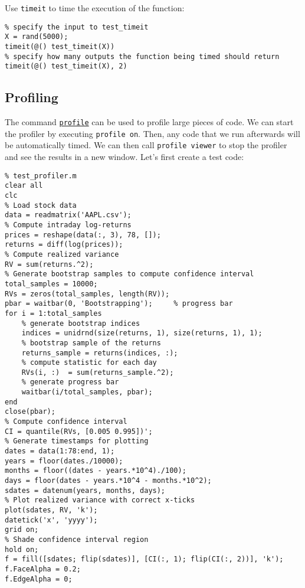 \documentclass[12pt, a4paper]{article}
\begin{document}
Use \texttt{timeit} to time the execution of the function:
\lstset{language=matlab,label= ,caption= ,captionpos=b,firstnumber=1,numbers=left,style=Matlab-editor}
\begin{lstlisting}
% specify the input to test_timeit
X = rand(5000);
timeit(@() test_timeit(X))
% specify how many outputs the function being timed should return
timeit(@() test_timeit(X), 2)
\end{lstlisting}
\subsection{Profiling}
\label{sec:org655ece7}
The command \href{https://www.mathworks.com/help/matlab/ref/profile.html}{\texttt{profile}} can be used to profile large pieces of code.
We can start the profiler by executing \texttt{profile on}.
Then, any code that we run afterwards will be automatically timed.
We can then call \texttt{profile viewer} to stop the profiler and see the results in a new window.
Let's first create a test code:
\lstset{language=matlab,label= ,caption= ,captionpos=b,firstnumber=1,numbers=left,style=Matlab-editor}
\begin{lstlisting}
% test_profiler.m
clear all
clc
% Load stock data
data = readmatrix('AAPL.csv');
% Compute intraday log-returns
prices = reshape(data(:, 3), 78, []);
returns = diff(log(prices));
% Compute realized variance
RV = sum(returns.^2);
% Generate bootstrap samples to compute confidence interval
total_samples = 10000;
RVs = zeros(total_samples, length(RV));
pbar = waitbar(0, 'Bootstrapping');     % progress bar
for i = 1:total_samples
    % generate bootstrap indices
    indices = unidrnd(size(returns, 1), size(returns, 1), 1);
    % bootstrap sample of the returns
    returns_sample = returns(indices, :);
    % compute statistic for each day
    RVs(i, :)  = sum(returns_sample.^2);
    % generate progress bar
    waitbar(i/total_samples, pbar);
end
close(pbar);
% Compute confidence interval
CI = quantile(RVs, [0.005 0.995])';
% Generate timestamps for plotting
dates = data(1:78:end, 1);
years = floor(dates./10000);
months = floor((dates - years.*10^4)./100);
days = floor(dates - years.*10^4 - months.*10^2);
sdates = datenum(years, months, days);
% Plot realized variance with correct x-ticks
plot(sdates, RV, 'k');
datetick('x', 'yyyy');
grid on;
% Shade confidence interval region
hold on;
f = fill([sdates; flip(sdates)], [CI(:, 1); flip(CI(:, 2))], 'k');
f.FaceAlpha = 0.2;
f.EdgeAlpha = 0;
\end{lstlisting}
\end{document}

